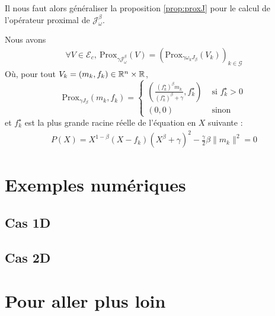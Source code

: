 \documentclass[a4paper,12pt]{article}
\newcommand{\prox}{\text{Prox}}
\begin{document}
Il nous faut alors généraliser la proposition \eqref{prop:proxJ} pour le calcul de l'opérateur proximal de $\mathcal{J}_{\omega}^{\beta}$. 
\begin{proposition}
Nous avons
\begin{align*}
\forall V\in\mathcal{E}_c,\ \prox_{\gamma \mathcal{J}_{\omega}^{\beta}}(V) = \left( \prox_{\gamma\omega_k J_{\beta}}(V_k)\right)_{k\in\mathcal{G}}
\end{align*}
Où, pour tout $V_k=(m_k,f_k)\in\mathbb{R}^n\times\mathbb{R}$, 
$$
\prox_{\gamma J_{\beta}}(m_k,f_k) =\left\{
\begin{array}{cl}
\left(\frac{(f^{\star}_k)^{\beta} m_k}{(f^{\star}_k)^{\beta}+\gamma} ,f^{\star}_k\right) & \text{ si } f^{\star}_k >0\\
(0,0) & \text{ sinon }
\end{array}\right.
$$
et $f^{\star}_k$ est la plus grande racine réelle de l'équation en $X$ suivante : 
\begin{align}
P(X) = X ^{1-\beta}(X-f_k)(X^{\beta}+\gamma)^2 -\frac{\gamma}{2}\beta\|m_k\|^2=0
\end{align}
\end{proposition}
\begin{preuve}

\end{preuve}

\section{Exemples numériques}
\subsection{Cas 1D}





\subsection{Cas 2D}

\section{Pour aller plus loin}
\end{document}
